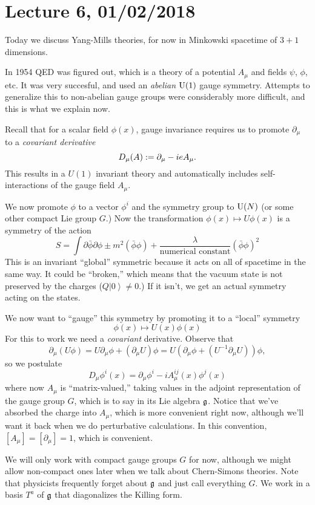 \section*{Lecture 6, 01/02/2018}
Today we discuss Yang-Mills theories, for now in Minkowski spacetime of $3+1$ dimensions.

In 1954 QED was figured out, which is a theory of a potential $A_\mu$ and fields $\psi$, $\phi$, etc.
It was very succesful, and used an \emph{abelian} $\operatorname{U} (1)$ gauge symmetry.
Attempts to generalize this to non-abelian gauge groups were considerably more difficult, and this is what we explain now.

Recall that for a scalar field $\phi(x)$, gauge invariance requires us to promote $\partial_\mu$ to a \emph{covariant derivative}
\[
D_\mu(A) := \partial_\mu - i e A_\mu.
\]
This results in a $U(1)$ invariant theory and automatically includes self-interactions of the gauge field $A_\mu$.

We now promote $\phi$ to a vector $\phi^i$ and the symmetry group to $\operatorname{U}(N)$ (or some other compact Lie group $G$.)
Now the transformation $\phi(x) \mapsto U \phi(x)$ is a symmetry of the action
\[
S = \int \partial \bar \phi \partial \phi \pm m^2(\bar \phi \phi) + \frac{\lambda}{\text{numerical constant}} (\bar \phi \phi)^2
\]
This is an invariant ``global'' symmetric because it acts on all of spacetime in the same way.
It could be ``broken,'' which means that the vacuum state is not preserved by the charges ($Q \left | 0 \right \rangle \ne 0$.)
If it isn't, we get an actual symmetry acting on the states.

We now want to ``gauge'' this symmetry by promoting it to a ``local'' symmetry
\[
\phi(x) \mapsto U(x) \phi(x)
\]
For this to work we need a \emph{covariant} derivative.
Observe that
\[
\partial_\mu(U \phi) = U \partial_\mu \phi + (\partial_\mu U) \phi = U(\partial_\mu \phi + (U^{-1} \partial_\mu U)) \phi,
\]
so we postulate
\[
D_\mu \phi^i(x) = \partial_\mu \phi^i - i A_\mu^{ij}(x) \phi^j(x)
\]
where now $A_\mu$ is ``matrix-valued,'' taking values in the adjoint representation of the gauge group $G$, which is to say in its Lie algebra $\mathfrak{g}$.
Notice that we've absorbed the charge into $A_\mu$, which is more convenient right now, although we'll want it back when we do perturbative calculations.
In this convention, $[A_\mu] = [\partial_\mu] = 1$, which is convenient.

We will only work with compact gauge groups $G$ for now, although we might allow non-compact ones later when we talk about Chern-Simons theories.
Note that physicists frequently forget about $\mathfrak{g}$ and just call everything $G$.
We work in a basis $T^a$ of $\mathfrak{g}$ that diagonalizes the Killing form.

